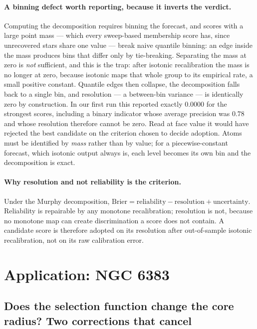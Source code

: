 \documentclass{aa}
\begin{document}
\paragraph{A binning defect worth reporting, because it inverts the verdict.} Computing the
decomposition requires binning the forecast, and scores with a large point mass --- which every
sweep-based membership score has, since unrecovered stars share one value --- break naive quantile
binning: an edge inside the mass produces bins that differ only by tie-breaking. Separating the
mass at zero is \emph{not} sufficient, and this is the trap: after isotonic recalibration the mass
is no longer at zero, because isotonic maps that whole group to its empirical rate, a small
positive constant. Quantile edges then collapse, the decomposition falls back to a single bin, and
resolution --- a between-bin variance --- is identically zero by construction. In our first run
this reported exactly $0.0000$ for the strongest scores, including a binary indicator whose
average precision was $0.78$ and whose resolution therefore cannot be zero. Read at face value it
would have rejected the best candidate on the criterion chosen to decide adoption. Atoms must be
identified by \emph{mass} rather than by value; for a piecewise-constant forecast, which isotonic
output always is, each level becomes its own bin and the decomposition is exact.

\paragraph{Why resolution and not reliability is the criterion.}
Under the Murphy decomposition, $\mathrm{Brier} = \mathrm{reliability} - \mathrm{resolution} +
\mathrm{uncertainty}$. Reliability is repairable by any monotone recalibration; resolution is
not, because no monotone map can create discrimination a score does not contain. A candidate
score is therefore adopted on its resolution after out-of-sample isotonic recalibration, not on
its raw calibration error.

\section{Application: NGC 6383}
\label{sec:ngc6383}

\subsection{Does the selection function change the core radius? Two corrections that cancel}
\label{sec:a1}
\end{document}
